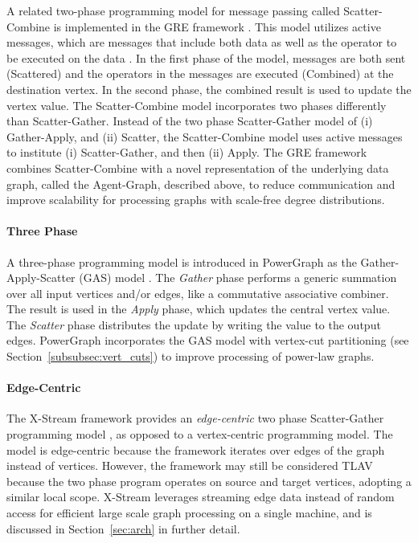 \documentclass[reprint,twocolumn,showpacs,preprintnumbers,amsmath, aps,pre,amssymb]{revtex4-1}
\begin{document}
A related two-phase programming model for message passing called Scatter-Combine is implemented in the GRE framework \cite{Yan2013}.  This model utilizes active messages, which are messages that include both data as well as the operator to be executed on the data \cite{VonEicken1992}.  In the first phase of the model, messages are both sent (Scattered) and the operators in the messages are executed (Combined) at the destination vertex.  In the second phase, the combined result is used to update the vertex value.  The Scatter-Combine model incorporates two phases differently than Scatter-Gather.  Instead of the two phase Scatter-Gather model of (i) Gather-Apply, and (ii) Scatter, the Scatter-Combine model uses active messages to institute (i) Scatter-Gather, and then (ii) Apply.  The GRE framework combines  Scatter-Combine with a novel representation of the underlying data graph, called the Agent-Graph, described above, to reduce communication and improve scalability for processing graphs with scale-free degree distributions.

\paragraph{Three Phase}  
\label{subsubsec:gas}
A three-phase programming model is introduced in PowerGraph as the Gather-Apply-Scatter (GAS) model \cite{Gonzalez2012}.  The \textit{Gather} phase performs a generic summation over all input vertices and/or edges, like a commutative associative combiner.  The result is used in the \textit{Apply} phase, which updates the central vertex value.  The \textit{Scatter} phase distributes the update by writing the value to the output edges.  PowerGraph incorporates the GAS model with vertex-cut partitioning (see Section~\ref{subsubsec:vert_cuts}) to improve processing of power-law graphs.

\paragraph{Edge-Centric} 
The X-Stream framework provides an \textit{edge-centric} two phase Scatter-Gather programming model \cite{Roy2013}, as opposed to a vertex-centric programming model.  The model is edge-centric because the framework iterates over edges of the graph instead of vertices.  However, the framework may still be considered TLAV because the two phase program operates on source and target vertices, adopting a similar local scope.  X-Stream leverages streaming edge data instead of random access for efficient large scale graph processing on a single machine, and is discussed in Section~\ref{sec:arch} in further detail.
\end{document}
